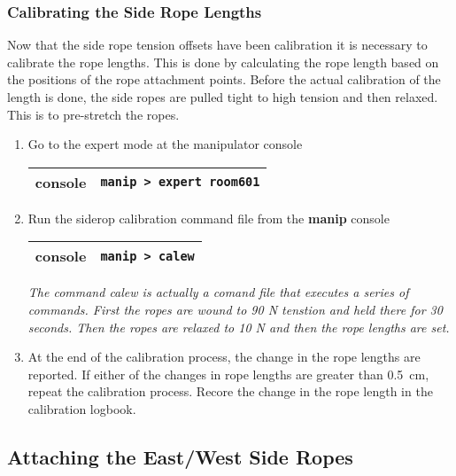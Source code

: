 
\subsubsection{Calibrating the Side Rope Lengths}
Now that the side rope tension offsets have been calibration it is necessary to calibrate the rope lengths. This is done by calculating the rope length based on the positions of the rope attachment points. Before the actual calibration of the length is done, the side ropes are pulled tight to high tension and then relaxed. This is to pre-stretch the ropes.
\begin{enumerate}
\item \CheckBox[name=csrl1]{} Go to the expert mode at the manipulator console
\begin{center}
\begin{tabular}{|c|c|}
\hline
console & \verb+manip > expert room601+\\
\hline
\end{tabular}
\end{center}
\item \CheckBox[name=csrl2]{} Run the siderop calibration command file from the {\bf manip} console
\begin{center}
\begin{tabular}{|c|c|}
\hline
console & \verb+manip > calew+\\
\hline
\end{tabular}
\end{center}
{\it The command calew is actually a comand file that executes a series of commands. First the ropes are wound to 90 N tenstion and held there for 30 seconds. Then the ropes are relaxed to 10 N and then the rope lengths are set.}
\item \CheckBox[name=csrl3] At the end of the calibration process, the change in the rope lengths are reported. If either of the changes in rope lengths are greater than 0.5~cm, repeat the calibration process. Recore the change in the rope length in the calibration logbook.
\end{enumerate}

\subsection{Attaching the East/West Side Ropes}

